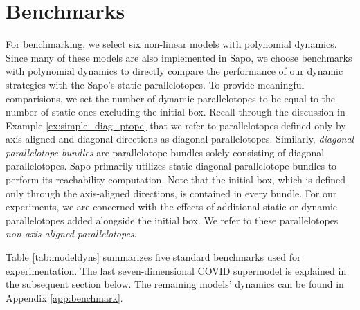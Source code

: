\section{Benchmarks}
\label{sec:benchmarks}
For benchmarking, we select six non-linear models with polynomial dynamics.
%
Since many of these models are also implemented in Sapo, we choose benchmarks with polynomial dynamics to directly compare the performance of our dynamic strategies with the Sapo's static parallelotopes. To provide meaningful comparisions, we set the number of dynamic parallelotopes to be equal to the number of static ones excluding the initial box.
%
Recall through the discussion in Example \ref{ex:simple_diag_ptope} that we refer to parallelotopes defined only by axis-aligned and diagonal directions as diagonal parallelotopes.
%
Similarly, \emph{diagonal parallelotope bundles} are parallelotope bundles solely consisting of diagonal parallelotopes. Sapo primarily utilizes static diagonal parallelotope bundles to perform its reachability computation.
%
Note that the initial box, which is defined only through the axis-aligned directions, is contained in every bundle.
%
For our experiments, we are concerned with the effects of additional static or dynamic parallelotopes added alongside the initial box. We refer to these parallelotopes \emph{non-axis-aligned parallelotopes}.

Table \ref{tab:modeldyns} summarizes five standard benchmarks used for experimentation. The last seven-dimensional COVID supermodel is explained in the subsequent section below. The remaining models' dynamics can be found in Appendix \ref{app:benchmark}.

\def \voltablespace {-0.8cm}

